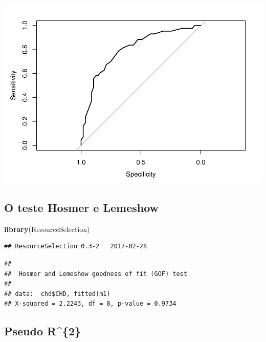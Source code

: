 \documentclass[12pt,brazil,]{book}
\newenvironment{Shaded}{\begin{snugshade}}{\end{snugshade}}
\newcommand{\DataTypeTok}[1]{\textcolor[rgb]{0.13,0.29,0.53}{#1}}
\newcommand{\DecValTok}[1]{\textcolor[rgb]{0.00,0.00,0.81}{#1}}
\newcommand{\KeywordTok}[1]{\textcolor[rgb]{0.13,0.29,0.53}{\textbf{#1}}}
\newcommand{\NormalTok}[1]{#1}
\newcommand{\OperatorTok}[1]{\textcolor[rgb]{0.81,0.36,0.00}{\textbf{#1}}}
\begin{document}
\includegraphics{05-RegLogist_files/figure-latex/unnamed-chunk-10-1.pdf}

\hypertarget{o-teste-hosmer-e-lemeshow}{%
\subsection{O teste Hosmer e Lemeshow}\label{o-teste-hosmer-e-lemeshow}}

\begin{Shaded}
\begin{Highlighting}[]
\KeywordTok{library}\NormalTok{(ResourceSelection)}
\end{Highlighting}
\end{Shaded}

\begin{verbatim}
## ResourceSelection 0.3-2   2017-02-28
\end{verbatim}

\begin{Shaded}
\end{Shaded}

\begin{verbatim}
## 
##  Hosmer and Lemeshow goodness of fit (GOF) test
## 
## data:  chd$CHD, fitted(m1)
## X-squared = 2.2243, df = 8, p-value = 0.9734
\end{verbatim}

\hypertarget{pseudo-r2}{%
\subsection{Pseudo R\^{}\{2\}}\label{pseudo-r2}}
\end{document}
